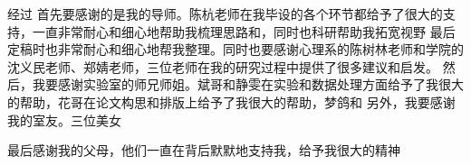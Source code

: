 \cleardoublepage
{}
经过
首先要感谢的是我的导师。陈杭老师在我毕设的各个环节都给予了很大的支持，一直非常耐心和细心地帮助我梳理思路和，同时也科研帮助我拓宽视野
最后定稿时也非常耐心和细心地帮我整理。同时也要感谢心理系的陈树林老师和学院的沈义民老师、郑婧老师，三位老师在我的研究过程中提供了很多建议和启发。
然后，我要感谢实验室的师兄师姐。斌哥和静雯在实验和数据处理方面给予了我很大的帮助，花哥在论文构思和排版上给予了我很大的帮助，梦鸽和
另外，我要感谢我的室友。三位美女


最后感谢我的父母，他们一直在背后默默地支持我，给予我很大的精神